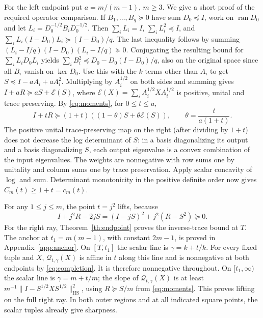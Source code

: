\documentclass[11pt]{article}
\newcommand{\ran}{\operatorname{ran}}
\newcommand{\HS}{\mathrm{HS}}
\begin{document}
For the left endpoint put \(a=m/(m-1)\), \(m\ge3\).
We give a short proof of the required operator comparison.
If \(B_1,\ldots,B_q\succeq0\) have sum \(D_0\preceq I\),
work on \(\ran D_0\) and let \(L_i=D_0^{-1/2}B_iD_0^{-1/2}\).
Then \(\sum_iL_i=I\), \(\sum_i L_i^2\preceq I\), and
\(\sum_i L_i(I-D_0)L_i\succeq (I-D_0)/q\).
The last inequality follows by summing
\((L_i-I/q)(I-D_0)(L_i-I/q)\succeq0\).
Conjugating the resulting bound for \(\sum_i L_iD_0L_i\) yields
\(\sum_i B_i^2\preceq D_0-D_0(I-D_0)/q\), also on the original
space since all \(B_i\) vanish on \(\ker D_0\).
Use this with the \(k\) terms other than \(A_i\) to get
\(S\preceq I-aA_i+aA_i^2\). Multiplying by \(A_i^{1/2}\) on
both sides and summing gives \(I+aR\succeq aS+\mathcal E(S)\),
where \(\mathcal E(X)=\sum_i A_i^{1/2}XA_i^{1/2}\) is positive,
unital and trace preserving. By \eqref{eq:moments},
for \(0\le t\le a\),
\[
 I+tR\succeq (1+t)((1-\theta)S+\theta\mathcal E(S)),
 \qquad \theta=\frac{t}{a(1+t)} .
\]
The positive unital trace-preserving map on the right (after
dividing by \(1+t\)) does not decrease the log determinant of \(S\):
in a basis diagonalizing its output and a basis diagonalizing \(S\),
each output eigenvalue is a convex combination of the input eigenvalues.
The weights are nonnegative with row sums one by unitality and column
sums one by trace preservation. Apply scalar concavity of \(\log\) and sum.
Determinant monotonicity in the positive definite order now gives
\(C_m(t)\ge1+t=c_m(t)\).

For any \(1\le j\le m\), the point \(t=j^2\) lifts, because
\[
I+j^2R-2jS=(I-jS)^2+j^2(R-S^2)\succeq0 .
\]
For the right ray, Theorem~\ref{th:endpoint} proves the inverse-trace
bound at \(T\). The anchor at \(t_1=m(m-1)\), with constant
\(2m-1\), is proved in Appendix~\ref{app:anchor}.
On \([T,t_1]\) the scalar line is \(\gamma=k+t/k\).
For every fixed tuple and \(X\), \(\mathcal Q_{t,\gamma}(X)\)
is affine in \(t\) along this line and is nonnegative at both endpoints
by \eqref{eq:completion}. It is therefore nonnegative throughout.
On \([t_1,\infty)\) the scalar line is \(\gamma=m+t/m\); the slope
of \(\mathcal Q_{t,\gamma}(X)\) is at least
\(m^{-1}\|I-S^{1/2}XS^{1/2}\|_{\HS}^2\), using \(R\succeq S/m\)
from \eqref{eq:moments}. This proves lifting on the full right ray.
In both outer regions and at all indicated square points, the
scalar tuples already give sharpness.
\end{document}
